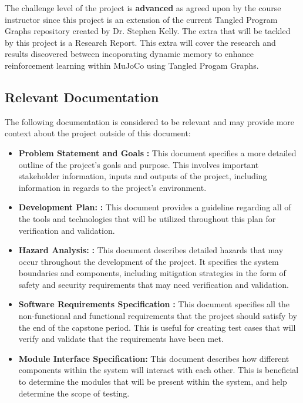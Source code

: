 \documentclass[12pt, titlepage]{article}
\begin{document}
The challenge level of the project is \textbf{advanced} as agreed upon by the course instructor since this project is an extension of the current Tangled Program Graphs repository created by Dr. Stephen Kelly.
The extra that will be tackled by this project is a Research Report. This extra will cover the research and results discovered between incoporating dynamic memory to enhance reinforcement learning within MuJoCo using Tangled Progam Graphs.

\subsection{Relevant Documentation}


The following documentation is considered to be relevant and may provide more context about the project outside of this document:
\begin{itemize}
  \item \textbf{Problem Statement and Goals} \citep{ProblemStatementGoals}\textbf{:} This document specifies a more detailed outline of the project's goals and purpose. This involves important stakeholder information, inputs and outputs of the project, including information in regards to the project's environment.
  \item \textbf{Development Plan:} \citep{DevelopmentPlan}\textbf{:} This document provides a guideline regarding all of the tools and technologies that will be utilized throughout this plan for verification and validation.
  \item \textbf{Hazard Analysis:} \citep{HazardAnalysis}\textbf{:} This document describes detailed hazards that may occur throughout the development of the project. It specifies the system boundaries and components, including mitigation strategies in the form of safety and security requirements that may need verification and validation.
  \item \textbf{Software Requirements Specification} \citep{SRS}\textbf{:} This document specifies all the non-functional and functional requirements that the project should satisfy by the end of the capstone period. This is useful for creating test cases that will verify and validate that the requirements have been met.
  \item \textbf{Module Interface Specification:} This document describes how different components within the system will interact with each other. This is beneficial to determine the modules that will be present within the system, and help determine the scope of testing.

\end{itemize}
\end{document}
